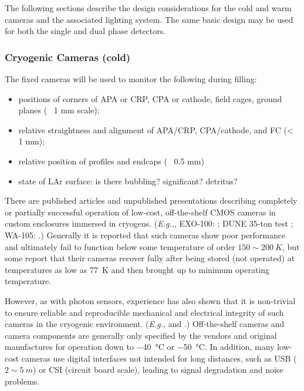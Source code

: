 The following sections describe the design considerations for the cold
and warm cameras and the associated lighting system.  The same basic
design may be used for both the single and dual phase detectors.



\subsubsection{Cryogenic Cameras (cold)}

The fixed cameras will be used to monitor the following during filling:
\begin{itemize}
\item positions of corners of APA or CRP, CPA or cathode, field cages, ground planes (~ 1 mm scale);
\item relative straightness and alignment of APA/CRP, CPA/cathode, and FC (<~ 1 mm);
\item relative position of profiles and endcaps (~ 0.5 mm)
\item state of LAr surface: is there bubbling? significant? detritus?
\end{itemize}

There are published articles and unpublished presentations describing
completely or partially successful operation of low-cost,
off-the-shelf CMOS cameras in custom enclosures immersed in cryogens.
({\em E.g.,}, EXO-100: \cite{Delaquis:2013hva}; DUNE 35-ton test
\cite{McConkey:2016spe}; WA-105: \cite{Murphy:20170516}.)  Generally
it is reported that such cameras show poor performance and ultimately
fail to function below some temperature of order \(150\sim\SI{
  200}{K}\), but some report that their cameras recover fully after
being stored (not operated) at temperatures as low as \SI{77}{K} and
then brought up to minimum operating temperature.

However, as with photon sensors, experience has also shown that it is
non-trivial to ensure reliable and reproducible mechanical and
electrical integrity of such cameras in the cryogenic environment.
({\em E.g.}, \cite{McConkey:2016spe} and
\cite{Valencia-Rodriquez:20180130}.)  Off-the-shelf cameras and camera
components are generally only specified by the vendors and original
manufactures for operation down to \SI{-40}{\celsius} or \SI{-50}{\celsius}.
In addition, many low-cost cameras use digital interfaces not intended
for long distances, such as USB (\(2\sim\SI{5}{m}\)) or CSI (circuit
board scale), leading to signal degradation and noise problems.

